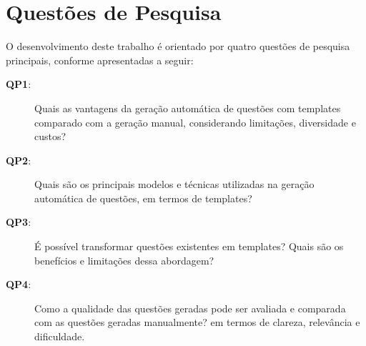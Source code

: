 \section{Questões de Pesquisa}

O desenvolvimento deste trabalho é orientado por quatro questões de pesquisa principais, conforme apresentadas a seguir:\\

\begin{description}
    \item[\textbf{QP1}:] Quais as vantagens da geração automática de questões com templates comparado com a geração manual, considerando limitações, diversidade e custos?
    \item[\textbf{QP2}:] Quais são os principais modelos e técnicas utilizadas na geração automática de questões, em termos de templates?
    \item[\textbf{QP3}:] É possível transformar questões existentes em templates? Quais são os benefícios e limitações dessa abordagem?
    \item[\textbf{QP4}:] Como a qualidade das questões geradas pode ser avaliada e comparada com as questões geradas manualmente? em termos de clareza, relevância e dificuldade.
\end{description}







